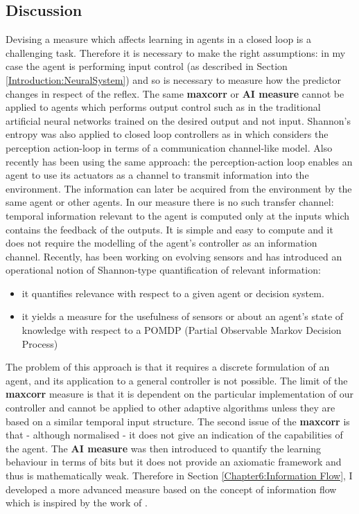 \subsection{Discussion}
Devising a measure which affects learning in agents in a closed loop is a challenging task.
Therefore it is necessary to make the right assumptions: in my case the agent
is performing input control (as described in Section \ref{Introduction:NeuralSystem})
and so is necessary to measure how the predictor changes in respect of the reflex.
The same \textbf{maxcorr} or \textbf{AI measure} cannot be applied to agents
which performs output control such as in the traditional artificial neural networks
trained on the desired output and not input.
Shannon's entropy was also applied to closed loop controllers as in
\citet{PhysRevLett.84.1156} which considers the perception action-loop
in terms of a communication channel-like model.
Also \citet{organizationInfo} recently has been using the
same approach: the perception-action loop enables an agent to use its actuators
as a channel to transmit information into the environment.
The information can later be acquired from the environment by the same agent or other agents.
In our measure there is no such transfer channel: temporal information
relevant to the agent is computed only at the inputs which contains the feedback
of the outputs. It is simple and easy to compute and it does not require the modelling of the agent's
controller as an information channel.
Recently, \citet{shannonSemantic} has been working on evolving sensors and has
 introduced an operational notion of Shannon-type quantification of relevant information:
\begin{itemize}
 \item it quantifies relevance with respect to a given agent or decision system.
 \item it yields a measure for the usefulness of sensors or about an agent's state
of knowledge with respect to a POMDP (Partial Observable Markov Decision Process)
\end{itemize}
The problem of this approach is that it requires a discrete formulation of
an agent, and its application to a general controller is not possible.
The limit of the \textbf{maxcorr} measure is that it is dependent on the particular implementation
of our controller and cannot be applied to other adaptive algorithms unless
they are based on a similar temporal input structure.
The second issue of the \textbf{maxcorr} is that - although normalised - it does not
give an indication of the capabilities of the agent.
The \textbf{AI measure} was then introduced to quantify the learning
behaviour in terms of bits but it does not provide an axiomatic framework and
thus is mathematically weak.
Therefore in Section \ref{Chapter6:Information Flow}, I developed a more
advanced measure based on the concept of information flow which is inspired by the
work of \citet{LungarellaInformation}.


